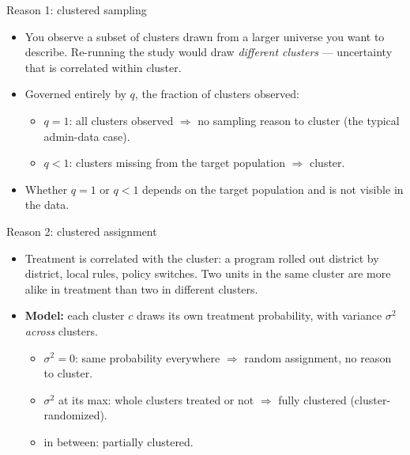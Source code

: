 \documentclass[11pt,aspectratio=169]{beamer}
\newcommand{\bx}[1]{\textbf{#1}}
\begin{document}
\begin{frame}{Reason 1: clustered sampling}
\begin{itemize}\setlength{\itemsep}{8pt}
  \item You observe a subset of clusters drawn from a larger universe you want to describe. Re-running the study
        would draw \emph{different clusters} --- uncertainty that is correlated within cluster.
  \item Governed entirely by $q$, the fraction of clusters observed:
    \begin{itemize}\setlength{\itemsep}{2pt}
      \item $q=1$: all clusters observed $\Rightarrow$ no sampling reason to cluster (the typical admin-data case).
      \item $q<1$: clusters missing from the target population $\Rightarrow$ cluster.
    \end{itemize}
  \item Whether $q=1$ or $q<1$ depends on the target population and is not visible in the data.
\end{itemize}
\end{frame}

\begin{frame}{Reason 2: clustered assignment}
\begin{itemize}\setlength{\itemsep}{7pt}
  \item Treatment is correlated with the cluster: a program rolled out district by district, local rules,
        policy switches. Two units in the same cluster are more alike in treatment than two in different clusters.
  \item \bx{Model:} each cluster $c$ draws its own treatment probability, with variance $\sigma^2$ \emph{across}
        clusters.
    \begin{itemize}\setlength{\itemsep}{2pt}
      \item $\sigma^2 = 0$: same probability everywhere $\Rightarrow$ random assignment, no reason to cluster.
      \item $\sigma^2$ at its max: whole clusters treated or not $\Rightarrow$ fully clustered (cluster-randomized).
      \item in between: partially clustered.
    \end{itemize}
\end{itemize}
\end{frame}
\end{document}
